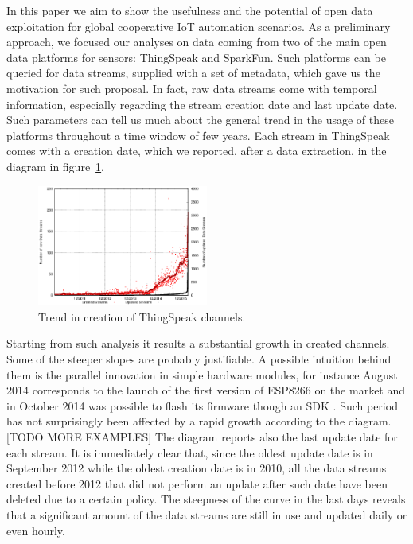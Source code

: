 \documentclass[conference]{IEEEtran}
\begin{document}
In this paper we aim to show the usefulness and the potential of open data exploitation for global cooperative IoT automation scenarios.
As a preliminary approach, we focused our analyses on data coming from two of the main open data platforms for sensors: ThingSpeak and SparkFun.
Such platforms can be queried for data streams, supplied with a set of metadata, which gave us the motivation for such proposal.
In fact, raw data streams come with temporal information, especially regarding the stream creation date and last update date.
Such parameters can tell us much about the general trend in the usage of these platforms throughout a time window of few years.
Each stream in ThingSpeak comes with a creation date, which we reported, after a data extraction, in the diagram in figure~\ref{creationtrend}.
\begin{figure}[!b]
\centering
\includegraphics[width=0.50\textwidth]{img/bars.eps} 
\caption{Trend in creation of ThingSpeak channels.}
\label{creationtrend}
\end{figure}
Starting from such analysis it results a substantial growth in created channels.
Some of the steeper slopes are probably justifiable.
A possible intuition behind them is the parallel innovation in simple hardware modules, for instance August 2014 corresponds to the launch of the first version of ESP8266 \cite{esp8266} on the market and in October 2014 was possible to flash its firmware though an SDK \cite{espressif}.
Such period has not surprisingly been affected by a rapid growth according to the diagram. [TODO MORE EXAMPLES]
The diagram reports also the last update date for each stream.
It is immediately clear that, since the oldest update date is in September 2012 while the oldest creation date is in 2010, all the data streams created before 2012 that did not perform an update after such date have been deleted due to a certain policy.
The steepness of the curve in the last days reveals that a significant amount of the data streams are still in use and updated daily or even hourly.
\\
\end{document}
